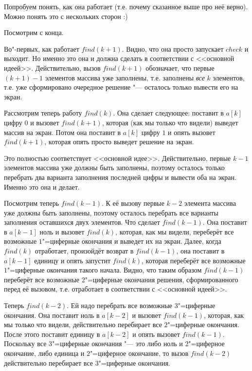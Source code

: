 \label{whyworks}
Попробуем понять, как она работает (т.е. почему сказанное выше про неё верно). 
Можно понять это с нескольких сторон :)

Посмотрим с конца.

Во"-{}первых, как работает $find(k+1)$. Видно, что она просто запускает $check$ и 
выходит. Но именно это она и должна сделать в соответствии с <<основной идеей>>. 
Действительно, вызов $find(k+1)$ обозначает, что первые $(k+1)-1$ элементов массива 
уже заполнены, т.е. заполнены \textit{все} $k$ элементов, т.е. уже сформировано очередное решение "--- осталось только вывести его на экран.

Рассмотрим теперь работу $find(k)$. Она сделает следующее: поставит в $a[k]$ цифру 
$0$ и вызовет $find(k+1)$, которая (как мы только что видели) выведет массив на 
экран. Потом она поставит в $a[k]$ цифру $1$ и опять вызовет $find(k+1)$, которая 
опять просто выведет решение на экран.

Это полностью соответствует <<основной идее>>. Действительно, первые $k-1$ 
элементов массива уже должны быть заполнены, поэтому осталось только перебрать 
два варианта заполнения последней цифры и вывести оба на экран. Именно это она 
и делает.

Посмотрим теперь $find(k-1)$. К её вызову первые $k-2$ элемента массива уже должны 
быть заполнены, поэтому осталось перебрать все варианты заполнения оставшихся 
двух элементов. Что сделает $find(k-1)$. Она поставит в $a[k-1]$ ноль и вызовет 
$find(k)$, которая, как мы видели, переберёт все возможные $1$"=циферные окончания и 
выведет их на экран. Далее, когда $find(k)$ отработает, произойдёт возврат в 
$find(k-1)$, она поставит в $a[k-1]$ единицу и опять запустит $find(k)$, которая 
переберёт все возможные $1$"=циферные окончания такого начала. Видно, что таким 
образом $find(k-1)$ переберёт все возможные $2$"=циферные окончания решения, 
сформированного перед её вызовом, т.е. отработает в соответствии с <<основной 
идеей>>.

Теперь $find(k-2)$. Ей надо перебрать все возможные $3$"=циферные окончания. Она 
поставит ноль в $a[k-2]$ и вызовет $find(k-1)$, которая, как мы только что видели, 
действительно перебирает все $2$"=циферные окончания. После этого поставит единицу 
в $a[k-2]$ и опять вызовет $find(k-1)$. Поскольку все $3$"=циферные окончания "--- это либо 
ноль и $2$"=циферное окончание, либо единица и $2$"=циферное окончание, то вызов 
$find(k-2)$ действительно перебирает все $3$"=циферные окончания.

